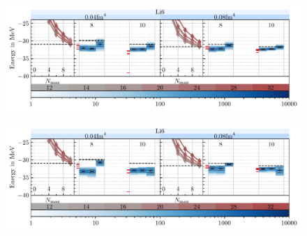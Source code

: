 \begin{figure}[H]
  \includegraphics[width=\textwidth]{media/li6_evaluation_abs.pdf}
\end{figure}

\begin{figure}[H]
  \includegraphics[width=\textwidth]{media/li6_evaluation_diff.pdf}
\end{figure}
